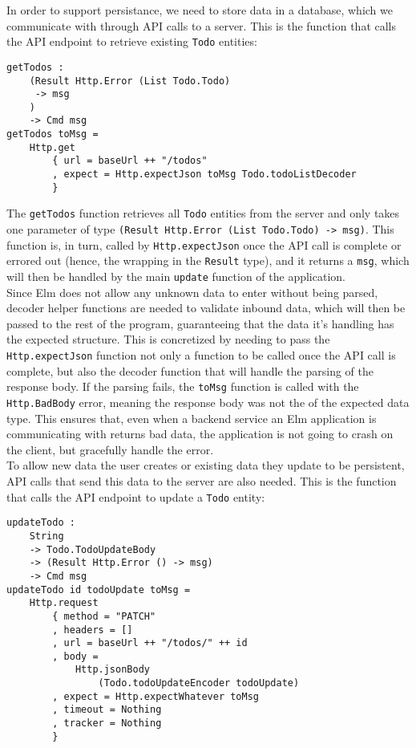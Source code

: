 In order to support persistance, we need to store data in a database, which we communicate with through API calls to a server. This is the function that calls the API endpoint to retrieve existing \texttt{Todo} entities:

\begin{verbatim}
getTodos :
    (Result Http.Error (List Todo.Todo)
     -> msg
    )
    -> Cmd msg
getTodos toMsg =
    Http.get
        { url = baseUrl ++ "/todos"
        , expect = Http.expectJson toMsg Todo.todoListDecoder
        }
\end{verbatim}

The \texttt{getTodos} function retrieves all \texttt{Todo} entities from the server and only takes one parameter of type \texttt{(Result Http.Error (List Todo.Todo) -> msg)}. This function is, in turn, called by \texttt{Http.expectJson} once the API call is complete or errored out (hence, the wrapping in the \texttt{Result} type), and it returns a \texttt{msg}, which will then be handled by the main \texttt{update} function of the application.\\

Since Elm does not allow any unknown data to enter without being parsed, decoder helper functions are needed to validate inbound data, which will then be passed to the rest of the program, guaranteeing that the data it's handling has the expected structure. This is concretized by needing to pass the \texttt{Http.expectJson} function not only a function to be called once the API call is complete, but also the decoder function that will handle the parsing of the response body. If the parsing fails, the \texttt{toMsg} function is called with the \texttt{Http.BadBody} error, meaning the response body was not the of the expected data type. This ensures that, even when a backend service an Elm application is communicating with returns bad data, the application is not going to crash on the client, but gracefully handle the error.\\

To allow new data the user creates or existing data they update to be persistent, API calls that send this data to the server are also needed. This is the function that calls the API endpoint to update a \texttt{Todo} entity:

\begin{verbatim}
updateTodo :
    String
    -> Todo.TodoUpdateBody
    -> (Result Http.Error () -> msg)
    -> Cmd msg
updateTodo id todoUpdate toMsg =
    Http.request
        { method = "PATCH"
        , headers = []
        , url = baseUrl ++ "/todos/" ++ id
        , body =
            Http.jsonBody
                (Todo.todoUpdateEncoder todoUpdate)
        , expect = Http.expectWhatever toMsg
        , timeout = Nothing
        , tracker = Nothing
        }
\end{verbatim}

